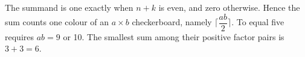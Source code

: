 The summand is one exactly when $n+k$ is even, and zero otherwise. Hence the sum counts one colour of an $a\times b$ checkerboard, namely $\lceil \dfrac{ab}{2}\rceil$. To equal five requires $ab=9$ or 10. The smallest sum among their positive factor pairs is $3+3=\boxed{6}$.
